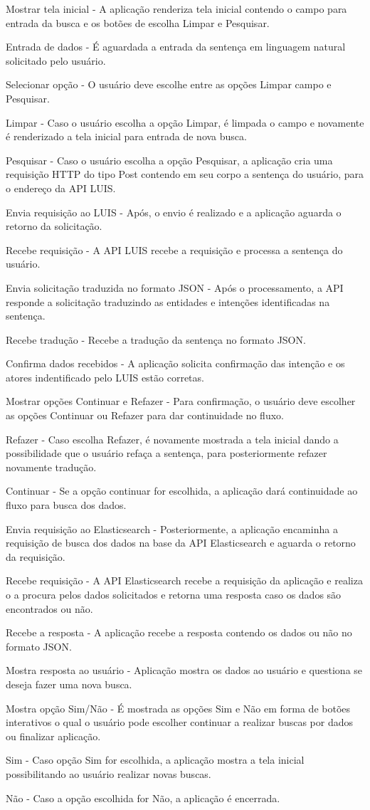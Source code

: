 	Mostrar tela inicial - A aplicação renderiza tela inicial contendo o campo para entrada da busca e os botões de escolha Limpar e Pesquisar.

	Entrada de dados - É aguardada a entrada da sentença em linguagem natural solicitado pelo usuário.

	Selecionar opção - O usuário deve escolhe entre as opções Limpar campo e Pesquisar.

	Limpar - Caso o usuário escolha a opção Limpar, é limpada o campo e novamente é renderizado a tela inicial para entrada de nova busca.

	Pesquisar - Caso o usuário escolha a opção Pesquisar, a aplicação cria uma requisição HTTP do tipo Post contendo em seu corpo a sentença do usuário, para o endereço da API LUIS.

	Envia requisição ao LUIS - Após, o envio é realizado e a aplicação aguarda o retorno da solicitação.

	Recebe requisição - A API LUIS recebe a requisição e processa a sentença do usuário.

	Envia solicitação traduzida no formato JSON - Após o processamento, a API responde a solicitação traduzindo as entidades e intenções identificadas na sentença.

	Recebe tradução - Recebe a tradução da sentença no formato JSON.

	Confirma dados recebidos - A aplicação solicita confirmação das intenção e os atores indentificado pelo LUIS estão corretas.

	Mostrar opções Continuar e Refazer - Para confirmação, o usuário deve escolher as opções Continuar ou Refazer para dar continuidade no fluxo.

	Refazer - Caso escolha Refazer, é novamente mostrada a tela inicial dando a possibilidade que o usuário refaça a sentença, para posteriormente refazer novamente tradução.

	Continuar - Se a opção continuar for escolhida, a aplicação dará continuidade ao fluxo para busca dos dados.

	Envia requisição ao Elasticsearch - Posteriormente, a aplicação encaminha a requisição  de busca dos dados na base da API Elasticsearch e aguarda o retorno da requisição.

	Recebe requisição - A API Elasticsearch recebe a requisição da aplicação e realiza o a procura pelos dados solicitados e retorna uma resposta caso os dados são encontrados ou não.

	Recebe a resposta - A aplicação recebe a resposta contendo os dados ou não no formato JSON.

	Mostra resposta ao usuário - Aplicação mostra os dados ao usuário e questiona se deseja fazer uma nova busca.

	Mostra opção Sim/Não - É mostrada as opções Sim e Não em forma de botões interativos o qual o usuário pode escolher continuar a realizar buscas por dados ou finalizar aplicação.

	Sim - Caso opção Sim for escolhida, a aplicação mostra a tela inicial possibilitando ao usuário realizar novas buscas.

	Não - Caso a opção escolhida for Não, a aplicação é encerrada.
